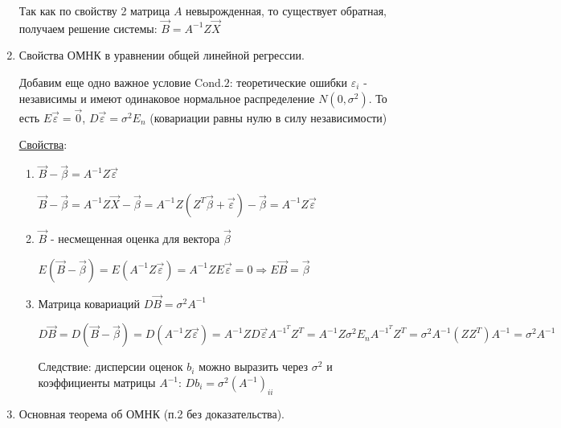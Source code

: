 \begin{enumerate}
    Так как по свойству 2 матрица $A$ невырожденная, то существует обратная, получаем решение системы: $\vec B = A^{-1} Z \vec X$

    \item Свойства ОМНК в уравнении общей линейной регрессии.

    Добавим еще одно важное условие $\mathrm{Cond. 2}$: теоретические ошибки $\varepsilon_i$ - независимы и имеют одинаковое нормальное распределение $N(0, \sigma^2)$.
    То есть $E \vec \varepsilon = \vec 0$, $D \vec \varepsilon = \sigma^2 E_n$ (ковариации равны нулю в силу независимости)

    \underline{\hyperlink{mls_evaluation_properties}{Свойства}}:

    \begin{enumerate}
        \item $\vec B - \vec \beta = A^{-1} Z \vec \varepsilon$

        \begin{MyProof}
            $\vec B - \vec \beta = A^{-1} Z \vec X - \vec \beta = A^{-1} Z (Z^T \vec \beta + \vec \varepsilon) - \vec \beta = A^{-1} Z \vec \varepsilon$
        \end{MyProof}

        \item $\vec B$ - несмещенная оценка для вектора $\vec \beta$

        \begin{MyProof}
            $E(\vec B - \vec \beta) = E(A^{-1} Z \vec \varepsilon) = A^{-1} Z E \vec \varepsilon = 0 \Longrightarrow E \vec B = \vec \beta$
        \end{MyProof}

        \item Матрица ковариаций $D \vec B = \sigma^2 A^{-1}$

        \begin{MyProof}
            $D \vec B = D (\vec B - \vec \beta) = D (A^{-1} Z \vec \varepsilon) = A^{-1} Z D \vec \varepsilon A^{-1}^T Z^T = A^{-1} Z \sigma^2 E_n A^{-1}^T Z^T = \sigma^2 A^{-1} (Z Z^T) A^{-1} = \sigma^2 A^{-1}$
        \end{MyProof}

        Следствие: дисперсии оценок $b_i$ можно выразить через $\sigma^2$ и коэффициенты матрицы $A^{-1}$: $D b_i = \sigma^2 (A^{-1})_{ii}$

    \end{enumerate}

    \item Основная теорема об ОМНК (п.2 без доказательства).


\end{enumerate}
